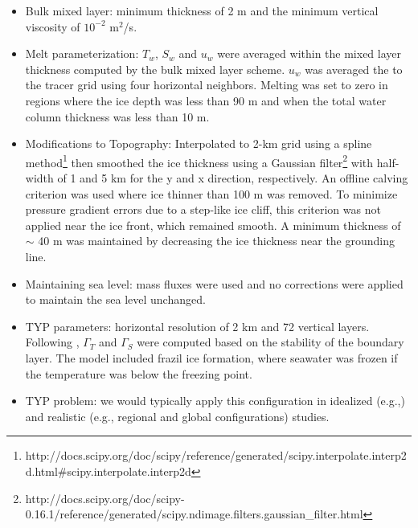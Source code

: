 \documentclass[11pt]{article} %
\begin{document}
\begin{itemize}
\item Bulk mixed layer: minimum thickness of 2 m and the minimum vertical viscosity of $10^{-2}$ m$^2$/s.

\item Melt parameterization: $T_w$, $S_w$ and $u_w$ were averaged within the mixed layer thickness computed by the bulk mixed layer scheme. $u_w$ was averaged the to the tracer grid using four horizontal neighbors. Melting was set to zero in regions where the ice depth was less than 90 m and when the total water column thickness was less than 10 m.

\item Modifications to Topography: Interpolated to 2-km grid using a spline method\footnote{http://docs.scipy.org/doc/scipy/reference/generated/scipy.interpolate.interp2d.html\#scipy.interpolate.interp2d} then smoothed the ice thickness using a Gaussian filter\footnote{http://docs.scipy.org/doc/scipy-0.16.1/reference/generated/scipy.ndimage.filters.gaussian\_filter.html} with half-width of 1 and 5 km for the y and x direction, respectively. An offline calving criterion was used where ice thinner than 100 m was removed. To minimize pressure gradient errors due to a step-like ice cliff, this criterion was not applied near the ice front, which remained smooth. A minimum thickness of $\sim$ 40 m was maintained by decreasing the ice thickness near the grounding line.  

\item Maintaining sea level: mass fluxes were used and no corrections were applied to maintain the sea level unchanged.  

\item TYP parameters: horizontal resolution of 2 km and 72 vertical layers. Following \cite{Holland1999}, $\Gamma_T$ and $\Gamma_S$ were computed based on the stability of the boundary layer. The model included frazil ice formation, where seawater was frozen if the temperature was below the freezing point.

\item TYP problem: we would typically apply this configuration in idealized (e.g.,\cite{Goldberg2012a,Goldberg2012b}) and realistic (e.g., regional and global configurations) studies. 

\end{itemize}






\end{document}
